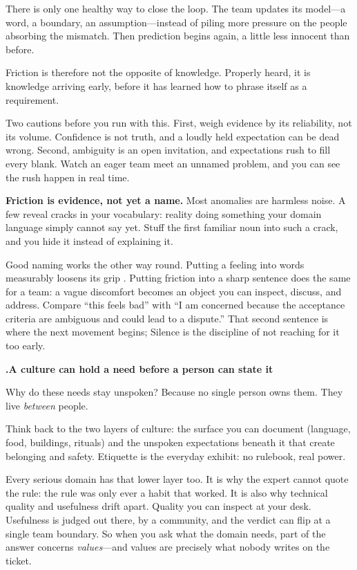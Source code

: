 \documentclass[10pt,a4paper]{article}
\newcounter{movement}
\newcounter{sub}[movement]
\renewcommand{\thesub}{\arabic{movement}.\arabic{sub}}
\newcommand{\SubHead}[1]{%
  \par\Needspace{5\baselineskip}\stepcounter{sub}\vspace{2mm}%
  {\ttfamily\bfseries\footnotesize\textcolor{G2}{\thesub}\enspace\sffamily\bfseries\normalsize #1\par}%
  \vspace{0.6mm}%
}
\begin{document}
There is only one healthy way to close the loop. The team updates its model—a word, a boundary, an assumption—instead of piling more pressure on the people absorbing the mismatch. Then prediction begins again, a little less innocent than before.

Friction is therefore not the opposite of knowledge. Properly heard, it is knowledge arriving early, before it has learned how to phrase itself as a requirement.

Two cautions before you run with this. First, weigh evidence by its reliability, not its volume. Confidence is not truth, and a loudly held expectation can be dead wrong. Second, ambiguity is an open invitation, and expectations rush to fill every blank. Watch an eager team meet an unnamed problem, and you can see the rush happen in real time.

\textbf{Friction is evidence, not yet a name.} Most anomalies are harmless noise. A few reveal cracks in your vocabulary: reality doing something your domain language simply cannot say yet. Stuff the first familiar noun into such a crack, and you hide it instead of explaining it.

Good naming works the other way round. Putting a feeling into words measurably loosens its grip \cite{lieberman07}. Putting friction into a sharp sentence does the same for a team: a vague discomfort becomes an object you can inspect, discuss, and address. Compare “this feels bad” with “I am concerned because the acceptance criteria are ambiguous and could lead to a dispute.” That second sentence is where the next movement begins; Silence is the discipline of not reaching for it too early.

\SubHead{A culture can hold a need before a person can state it}

Why do these needs stay unspoken? Because no single person owns them. They live \emph{between} people.

Think back to the two layers of culture: the surface you can document (language, food, buildings, rituals) and the unspoken expectations beneath it that create belonging and safety. Etiquette is the everyday exhibit: no rulebook, real power.

Every serious domain has that lower layer too. It is why the expert cannot quote the rule: the rule was only ever a habit that worked. It is also why technical quality and usefulness drift apart. Quality you can inspect at your desk. Usefulness is judged out there, by a community, and the verdict can flip at a single team boundary. So when you ask what the domain needs, part of the answer concerns \emph{values}—and values are precisely what nobody writes on the ticket.
\end{document}
